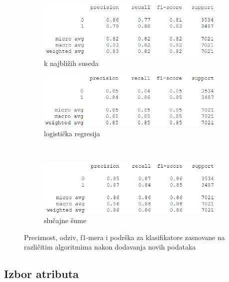 \documentclass[12pt,oneside]{memoir}
\begin{document}
\begin{figure}[!ht]
    \centering
    \begin{subfigure}[b]{0.45\textwidth}
        \centering
        \includegraphics[width=\textwidth]{knn2}
        \caption{k najbližih suseda}
        \label{fig:kn3}
    \end{subfigure}
    \begin{subfigure}[b]{0.45\textwidth}
        \centering
        \includegraphics[width=\textwidth]{logreg2}
        \caption{logistička regresija}
        \label{fig:logreg3}
    \end{subfigure}
    \\
    \begin{subfigure}[b]{0.45\textwidth}
        \centering
        \includegraphics[width=\textwidth]{randfor2}
        \caption{slučajne šume}
        \label{fig:randfor3}
    \end{subfigure}
    \caption{Preciznost, odziv, f1-mera i podrška za klasifikatore zasnovane na različitim algoritmima nakon dodavanja novih podataka}
    \label{fig:dodatno2}
\end{figure}

\subsection{Izbor atributa}
\end{document}
